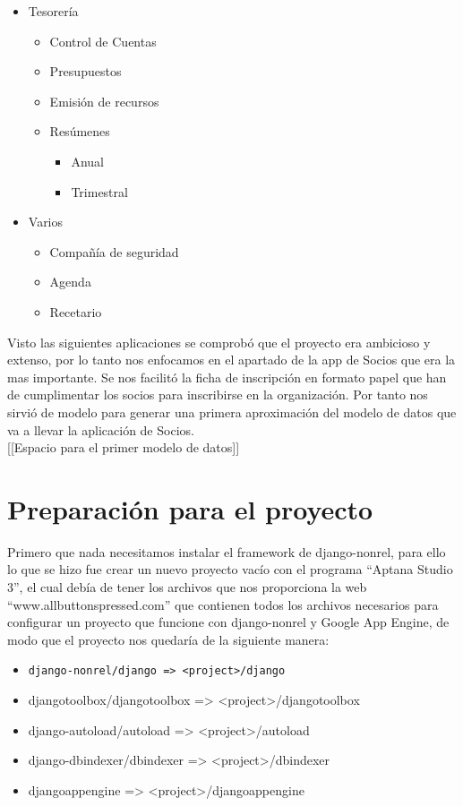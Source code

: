 \begin{itemize}
\item Tesorería
	\begin{itemize}
	\item Control de Cuentas
	\item Presupuestos
	\item Emisión de recursos
	\item Resúmenes
		\begin{itemize}
		\item Anual
		\item Trimestral
		\end{itemize}
	\end{itemize}

\item Varios
	\begin{itemize}
	\item Compañía de seguridad
	\item Agenda
	\item Recetario
	\end{itemize}
\end{itemize}

Visto las siguientes aplicaciones se comprobó que el proyecto era ambicioso y extenso, 
por lo tanto nos enfocamos en el apartado de la app de Socios que era la mas importante. 
Se nos facilitó la ficha de inscripción en formato papel que han de cumplimentar los socios para inscribirse en la organización.
Por tanto nos sirvió de modelo para generar una primera aproximación del modelo de datos que va a llevar la aplicación de Socios.\\

[[Espacio para el primer modelo de datos]]

\section{Preparación para el proyecto}
\label{4:sec3}

Primero que nada necesitamos instalar el framework de django-nonrel, para ello lo que se hizo fue crear un nuevo proyecto vacío con el 
programa ``Aptana Studio 3'', el cual debía de tener los archivos que nos proporciona la web ``www.allbuttonspressed.com'' que contienen 
todos los archivos necesarios para configurar un proyecto que funcione con django-nonrel y Google App Engine, 
de modo que el proyecto nos quedaría de la siguiente manera:

\begin{itemize}
  \item \lstinline!django-nonrel/django => <project>/django!
  \item djangotoolbox/djangotoolbox => <project>/djangotoolbox
  \item django-autoload/autoload => <project>/autoload
  \item django-dbindexer/dbindexer => <project>/dbindexer
  \item djangoappengine => <project>/djangoappengine
\end{itemize}

